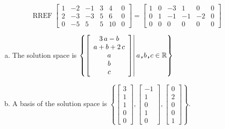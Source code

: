 \begin{exerciseAnswer} 


\[\operatorname{RREF} \left[\begin{array}{ccccc|c}
1 & -2 & -1 & 3 & 4 & 0 \\
2 & -3 & -3 & 5 & 6 & 0 \\
0 & -5 & 5 & 5 & 10 & 0
\end{array}\right] = \left[\begin{array}{ccccc|c}
1 & 0 & -3 & 1 & 0 & 0 \\
0 & 1 & -1 & -1 & -2 & 0 \\
0 & 0 & 0 & 0 & 0 & 0
\end{array}\right] \]


\begin{enumerate}[(a)]
\item The solution space is \( \left\{ \left[\begin{array}{c}
3 \, a - b \\
a + b + 2 \, c \\
a \\
b \\
c
\end{array}\right] \middle|\,a\text{\texttt{,}}b\text{\texttt{,}}c\in\mathbb{R}\right\} \)
\item A basis of the solution space is \( \left\{ \left[\begin{array}{c}
3 \\
1 \\
1 \\
0 \\
0
\end{array}\right] , \left[\begin{array}{c}
-1 \\
1 \\
0 \\
1 \\
0
\end{array}\right] , \left[\begin{array}{c}
0 \\
2 \\
0 \\
0 \\
1
\end{array}\right] \right\} \).
\end{enumerate}
    
\end{exerciseAnswer}
    
